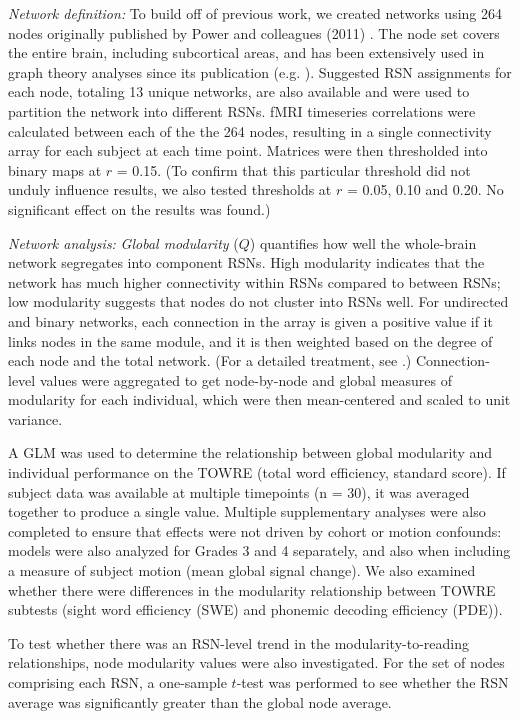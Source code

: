 \emph{Network definition:} To build off of previous work, we created networks using 264 nodes originally published by Power and colleagues (2011) \citep{Power2011}. The node set covers the entire brain, including subcortical areas, and has been extensively used in graph theory analyses since its publication (e.g. \citep{Cole2014, Godwin2015, Mattar2015}). Suggested RSN assignments for each node, totaling 13 unique networks, are also available and were used to partition the network into different RSNs. fMRI timeseries correlations were calculated between each of the the 264 nodes, resulting in a single connectivity array for each subject at each time point. Matrices were then thresholded into binary maps at $r$ = 0.15. (To confirm that this particular threshold did not unduly influence results, we also tested thresholds at $r$ = 0.05, 0.10 and 0.20. No significant effect on the results was found.)


\emph{Network analysis:} \textit{Global modularity} ($Q$) quantifies how well the whole-brain network segregates into component RSNs. High modularity indicates that the network has much higher connectivity within RSNs compared to between RSNs; low modularity suggests that nodes do not cluster into RSNs well. For undirected and binary networks, each connection in the array is given a positive value if it links nodes in the same module, and it is then weighted based on the degree of each node and the total network. (For a detailed treatment, see \citep{Rubinov2010}.) Connection-level values were aggregated to get node-by-node and global measures of modularity for each individual, which were then mean-centered and scaled to unit variance. 

A GLM was used to determine the relationship between global modularity and individual performance on the TOWRE (total word efficiency, standard score). If subject data was available at multiple timepoints (n = 30), it was averaged together to produce a single value. Multiple supplementary analyses were also completed to ensure that effects were not driven by cohort or motion confounds: models were also analyzed for Grades 3 and 4 separately, and also when including a measure of subject motion (mean global signal change). We also examined whether there were differences in the modularity relationship between TOWRE subtests (sight word efficiency (SWE) and phonemic decoding efficiency (PDE)).

To test whether there was an RSN-level trend in the modularity-to-reading relationships, node modularity values were also investigated. For the set of nodes comprising each RSN, a one-sample $t$-test was performed to see whether the RSN average was significantly greater than the global node average. 

